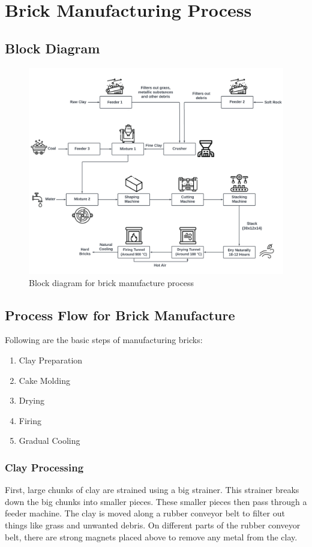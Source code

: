 \section{Brick Manufacturing Process}

\subsection{Block Diagram}
\begin{figure}[h]
  \centering
  \includegraphics[width=1\textwidth]{img/block diagram.png}
  \caption{Block diagram for brick manufacture process}
\end{figure}

\subsection{Process Flow for Brick Manufacture}
Following are the basic steps of manufacturing bricks:
\begin{enumerate}
\item Clay Preparation
\item Cake Molding
\item Drying
\item Firing 
\item Gradual Cooling
\end{enumerate}

\newpage

\subsubsection{Clay Processing}
First, large chunks of clay are strained using a big strainer. This strainer breaks down the big chunks into smaller pieces. These smaller pieces then pass through a feeder machine. The clay is moved along a rubber conveyor belt to filter out things like grass and unwanted debris. On different parts of the rubber conveyor belt, there are strong magnets placed above to remove any metal from the clay.


